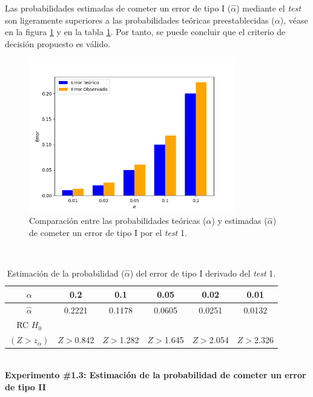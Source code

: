 \documentclass[12pt]{report}
\begin{document}
Las probabilidades estimadas de cometer un error de tipo I ($\hat{\alpha}$) mediante el \textit{test} son ligeramente superiores  a las probabilidades teóricas preestablecidas ($\alpha$), véase en la figura \ref{Teorico vs Observado} y en la tabla \ref{3td:error1-prob}. Por tanto, se puede concluir que el criterio de decisión propuesto es válido.
	\begin{figure}[ht]
	\centering
	
	\includegraphics[width=0.8\textwidth]{3td_teo_obs.png}
	\caption{Comparación entre las probabilidades teóricas ($\alpha$) y estimadas ($\hat{\alpha}$) de cometer un error de tipo I por el \textit{test} 1. }
	\label{Teorico vs Observado}
\end{figure}\\
\begin{table}[h!]
	\centering
	\begin{tabular}{|c|ccccc|}
		\hline
		$\alpha$ &  0.2 &  0.1 &  0.05 & 0.02 &  0.01 \\
		\hline
		$\hat{\alpha}$ & 0.2221 & 0.1178 & 0.0605 & 0.0251 & 0.0132 \\
		\hline
		RC $H_0$      &         &         &        &        &  \\
		 $(Z>z_\alpha)$&  $Z>$0.842& $Z>$1.282& $Z>$1.645& $Z>$2.054& $Z>$2.326 \\
		\hline
	\end{tabular}
	\caption{Estimación de la probabilidad ($\hat{\alpha}$) del error de tipo I derivado del \textit{test} 1.}
	\label{3td:error1-prob}
\end{table}
\\
\textbf{Experimento \#1.3: Estimación de la probabilidad de cometer un error de tipo II}
\end{document}
